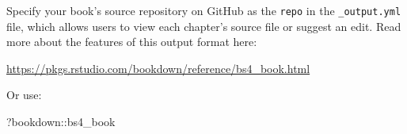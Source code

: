 \documentclass[
]{bxjsbook}
\newenvironment{Shaded}{\begin{snugshade}}{\end{snugshade}}
\newcommand{\NormalTok}[1]{#1}
\newcommand{\SpecialCharTok}[1]{\textcolor[rgb]{0.00,0.00,0.00}{#1}}
\theoremstyle{definition}
\theoremstyle{definition}
\theoremstyle{definition}
\theoremstyle{definition}
\theoremstyle{remark}
\begin{document}
Specify your book's source repository on GitHub as the \texttt{repo} in the \texttt{\_output.yml} file, which allows users to view each chapter's source file or suggest an edit. Read more about the features of this output format here:

\url{https://pkgs.rstudio.com/bookdown/reference/bs4_book.html}

Or use:

\begin{Shaded}
\begin{Highlighting}[]
\NormalTok{?bookdown}\SpecialCharTok{::}\NormalTok{bs4\_book}
\end{Highlighting}
\end{Shaded}


  
\end{document}
